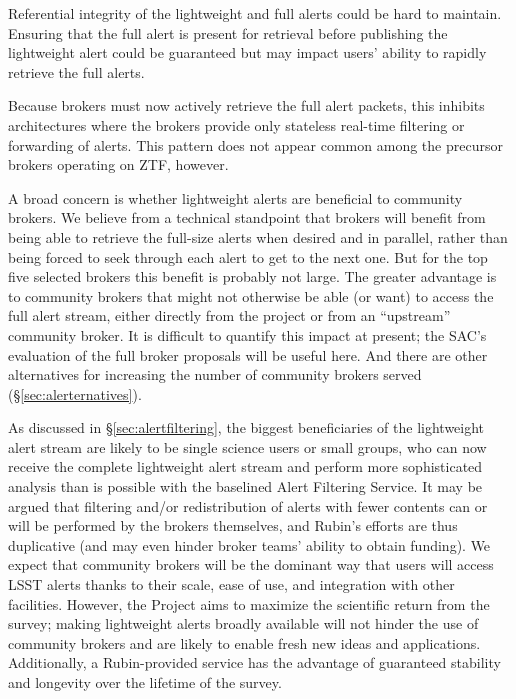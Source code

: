 \documentclass[DM,authoryear,toc]{lsstdoc}
\begin{document}
Referential integrity of the lightweight and full alerts could be hard to maintain.
Ensuring that the full alert is present for retrieval before publishing the lightweight alert could be guaranteed
but may impact users' ability to rapidly retrieve the full alerts.

Because brokers must now actively retrieve the full alert packets, this inhibits architectures where the brokers provide only stateless real-time filtering or forwarding of alerts.
This pattern does not appear common among the precursor brokers operating on ZTF, however.

A broad concern is whether lightweight alerts are beneficial to community brokers.
We believe from a technical standpoint that brokers will benefit from being able to retrieve the full-size alerts when desired and in parallel, rather than being forced to seek through each alert to get to the next one.
But for the top five selected brokers this benefit is probably not large.
The greater advantage is to community brokers that might not otherwise be able (or want) to access the full alert stream, either directly from the project or from an ``upstream'' community broker.
It is difficult to quantify this impact at present; the SAC's evaluation of the full broker proposals will be useful here.
And there are other alternatives for increasing the number of community brokers served (\S \ref{sec:alerternatives}).

As discussed in \S \ref{sec:alertfiltering}, the biggest beneficiaries of the lightweight alert stream are likely to be single science users or small groups, who can now receive the complete lightweight alert stream and perform more sophisticated analysis than is possible with the baselined Alert Filtering Service.
It may be argued that filtering and/or redistribution of alerts with fewer contents can or will be performed by the brokers themselves, and Rubin's efforts are thus duplicative (and may even hinder broker teams' ability to obtain funding).
We expect that community brokers will be the dominant way that users will access LSST alerts thanks to their scale, ease of use, and integration with other facilities.
However, the Project aims to maximize the scientific return from the survey; making lightweight alerts broadly available will not hinder the use of community brokers and are likely to enable fresh new ideas and applications.
Additionally, a Rubin-provided service has the advantage of guaranteed stability and longevity over the lifetime of the survey.
\end{document}
